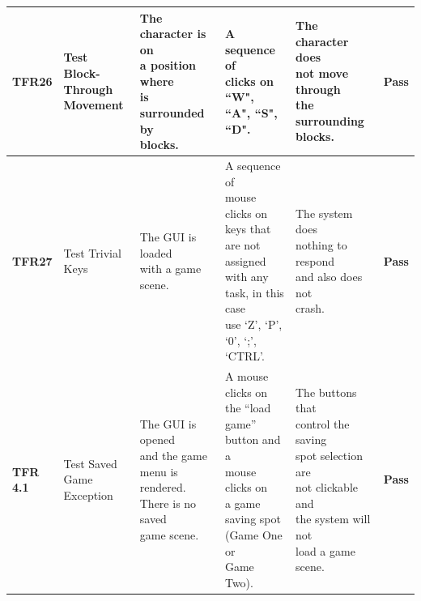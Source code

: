 \documentclass[12pt, titlepage]{article}
\begin{document}
\begin{center}
\begin{longtable}[!bpht]{|m{1.3cm}|m{2.3cm}|m{3.4cm}|m{3.4cm}|m{3.4cm}|m{1cm}|}
\textbf{TFR26} & \makecell[ml]{Test\\ Block-Through\\ Movement} & \makecell[ml]{The character is on\\ a position where\\ is surrounded by\\ blocks.} & \makecell[ml]{A sequence of\\ clicks on ``W",\\ ``A", ``S", ``D".} & \makecell[ml]{The character does\\ not move through\\ the surrounding\\ blocks.}& \textbf{Pass}\\\hline

\textbf{TFR27} & \makecell[ml]{Test Trivial\\ Keys} & \makecell[ml]{The GUI is loaded\\ with a game scene.} & \makecell[ml]{A sequence of\\ mouse clicks on\\ keys that are not\\ assigned with any\\ task, in this case\\ use `Z', `P', `0', `;',\\ `CTRL'.} & \makecell[ml]{The system does\\ nothing to respond\\ and also does not\\ crash.} & \textbf{Pass}\\\hline

\makecell[ml]{\textbf{TFR}\\\textbf{4.1}} & \makecell[ml]{Test Saved\\ Game\\ Exception} & \makecell[ml]{The GUI is opened\\ and the game\\ menu is rendered.\\ There is no saved\\ game scene.} & \makecell[ml]{A mouse clicks on\\ the ``load game”\\ button and a\\ mouse clicks on\\ a game saving spot\\ (Game One or\\ Game Two).} & \makecell[ml]{The buttons that\\ control the saving\\ spot selection are\\ not clickable and\\ the system will not\\ load a game scene.} & \textbf{Pass}\\\hline


\end{longtable}
\end{center}
\end{document}
